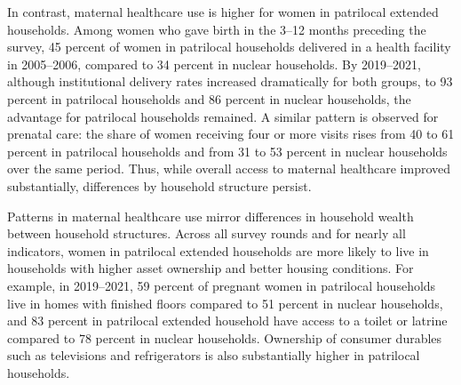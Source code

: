 \documentclass[12pt]{article}
\begin{document}
In contrast, maternal healthcare use is higher for women in patrilocal extended households. Among women who gave birth in the 3–12 months preceding the survey, 45 percent of women in patrilocal households delivered in a health facility in 2005–2006, compared to 34 percent in nuclear households. By 2019–2021, although institutional delivery rates increased dramatically for both groups, to 93 percent in patrilocal households and 86 percent in nuclear households, the advantage for patrilocal households remained. A similar pattern is observed for prenatal care: the share of women receiving four or more visits rises from 40 to 61 percent in patrilocal households and from 31 to 53 percent in nuclear households over the same period. Thus, while overall access to maternal healthcare improved substantially, differences by household structure persist.

Patterns in maternal healthcare use mirror differences in household wealth between household structures. Across all survey rounds and for nearly all indicators, women in patrilocal extended households are more likely to live in households with higher asset ownership and better housing conditions. For example, in 2019–2021, 59 percent of pregnant women in patrilocal households live in homes with finished floors compared to 51 percent in nuclear households, and 83 percent in patrilocal extended household have access to a toilet or latrine compared to 78 percent in nuclear households. Ownership of consumer durables such as televisions and refrigerators is also substantially higher in patrilocal households.
\end{document}
